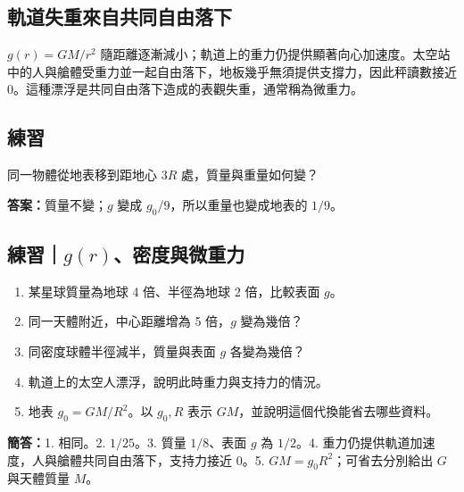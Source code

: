 \documentclass[11pt,a4paper]{article}
\providecommand{\tightlist}{%
  \setlength{\itemsep}{0pt}\setlength{\parskip}{0pt}}
\begin{document}
\subsection{軌道失重來自共同自由落下}\label{ux8eccux9053ux5931ux91cdux4f86ux81eaux5171ux540cux81eaux7531ux843dux4e0b}

\(g(r)=GM/r^2\) 隨距離逐漸減小；軌道上的重力仍提供顯著向心加速度。太空站中的人與艙體受重力並一起自由落下，地板幾乎無須提供支撐力，因此秤讀數接近 0。這種漂浮是共同自由落下造成的表觀失重，通常稱為微重力。

\begin{HandoutSelfCheck}

\subsection{練習}\label{ux7df4ux7fd2-1}

同一物體從地表移到距地心 \(3R\) 處，質量與重量如何變？

\textbf{答案：}質量不變；\(g\) 變成 \(g_0/9\)，所以重量也變成地表的 \(1/9\)。

\end{HandoutSelfCheck}

\begin{HandoutSelfCheck}

\subsection{\texorpdfstring{練習｜\(g(r)\)、密度與微重力}{練習｜g(r)、密度與微重力}}\label{ux7df4ux7fd2grux5bc6ux5ea6ux8207ux5faeux91cdux529b}

\begin{enumerate}
\def\labelenumi{\arabic{enumi}.}
\tightlist
\item
  某星球質量為地球 4 倍、半徑為地球 2 倍，比較表面 \(g\)。
\item
  同一天體附近，中心距離增為 5 倍，\(g\) 變為幾倍？
\item
  同密度球體半徑減半，質量與表面 \(g\) 各變為幾倍？
\item
  軌道上的太空人漂浮，說明此時重力與支持力的情況。
\item
  地表 \(g_0=GM/R^2\)。以 \(g_0,R\) 表示 \(GM\)，並說明這個代換能省去哪些資料。
\end{enumerate}

\textbf{簡答：}1. 相同。2. \(1/25\)。3. 質量 \(1/8\)、表面 \(g\) 為 \(1/2\)。4. 重力仍提供軌道加速度，人與艙體共同自由落下，支持力接近 0。5. \(GM=g_0R^2\)；可省去分別給出 \(G\) 與天體質量 \(M\)。

\end{HandoutSelfCheck}
\end{document}
